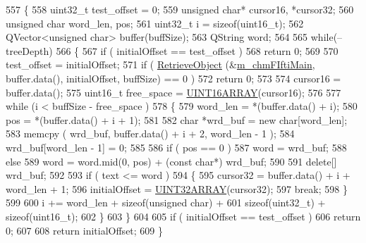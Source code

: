 \begin{DoxyCode}
557 \{
558     uint32\_t test\_offset = 0;
559     \textcolor{keywordtype}{unsigned} \textcolor{keywordtype}{char}* cursor16, *cursor32;
560     \textcolor{keywordtype}{unsigned} \textcolor{keywordtype}{char} word\_len, pos;
561     uint32\_t i = \textcolor{keyword}{sizeof}(uint16\_t);
562     QVector<unsigned char> buffer(buffSize);
563     QString word;
564     
565     \textcolor{keywordflow}{while}(--treeDepth)
566     \{
567         \textcolor{keywordflow}{if} ( initialOffset == test\_offset )
568             \textcolor{keywordflow}{return} 0;
569 
570         test\_offset = initialOffset;
571         \textcolor{keywordflow}{if} ( \hyperlink{classLCHMFileImpl_a8535dce5eb8f22161ecf3510fde8aa4e}{RetrieveObject} (&\hyperlink{classLCHMFileImpl_aff4c9c66f19b11205e4cbdabc7b2d8aa}{m\_chmFIftiMain}, buffer.data(), initialOffset, 
      buffSize) == 0 )
572             \textcolor{keywordflow}{return} 0;
573 
574         cursor16 = buffer.data();
575         uint16\_t free\_space = \hyperlink{bitfiddle_8h_a4cdadd3f542d83f288d0b415c397fbb9}{UINT16ARRAY}(cursor16);
576 
577         \textcolor{keywordflow}{while} (i < buffSize - free\_space )
578         \{
579             word\_len = *(buffer.data() + i);
580             pos = *(buffer.data() + i + 1);
581 
582             \textcolor{keywordtype}{char} *wrd\_buf = \textcolor{keyword}{new} \textcolor{keywordtype}{char}[word\_len];
583             memcpy ( wrd\_buf, buffer.data() + i + 2, word\_len - 1 );
584             wrd\_buf[word\_len - 1] = 0;
585 
586             \textcolor{keywordflow}{if} ( pos == 0 )
587                 word = wrd\_buf;
588             \textcolor{keywordflow}{else}
589                 word = word.mid(0, pos) + (\textcolor{keyword}{const} \textcolor{keywordtype}{char}*) wrd\_buf;
590 
591             \textcolor{keyword}{delete}[] wrd\_buf;
592 
593             \textcolor{keywordflow}{if} ( text <= word )
594             \{
595                 cursor32 = buffer.data() + i + word\_len + 1;
596                 initialOffset = \hyperlink{bitfiddle_8h_a09e5156ae22f7b3ea6e8fe0f94084390}{UINT32ARRAY}(cursor32);
597                 \textcolor{keywordflow}{break};
598             \}
599 
600             i += word\_len + \textcolor{keyword}{sizeof}(\textcolor{keywordtype}{unsigned} char) +
601                     \textcolor{keyword}{sizeof}(uint32\_t) + \textcolor{keyword}{sizeof}(uint16\_t);
602         \}
603     \}
604 
605     \textcolor{keywordflow}{if} ( initialOffset == test\_offset )
606         \textcolor{keywordflow}{return} 0;
607 
608     \textcolor{keywordflow}{return} initialOffset;
609 \}
\end{DoxyCode}

